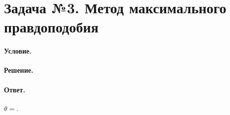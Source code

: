 
\section{Задача №3. Метод максимального правдоподобия}

\paragraph{Условие.}
\paragraph{Решение.}
\noindent
\paragraph{Ответ.} $\displaystyle\theta =$.